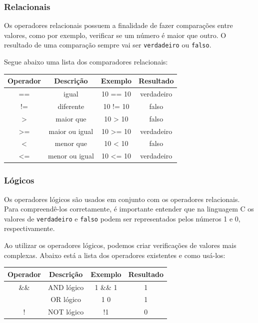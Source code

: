 \subsubsection{Relacionais}

Os operadores relacionais possuem a finalidade de fazer comparações entre 
valores, como por exemplo, verificar se um número é maior que outro. O 
resultado de uma comparação sempre vai ser \texttt{verdadeiro} ou 
\texttt{falso}.

Segue abaixo uma lista dos comparadores relacionais:

\begin{center}
    \begin{tabular}{|c|c|c|c|}
        \hline
        Operador & Descrição & Exemplo & Resultado \\
        \hline
        == & igual & 10 == 10 & verdadeiro \\
        \hline
        != & diferente & 10 != 10 & falso \\
        \hline
        \textgreater{} & maior que & 10 \textgreater{} 10 & falso \\
        \hline
        \textgreater{}= & maior ou igual & 10 \textgreater{}= 10 & verdadeiro \\
        \hline
        \textless{} & menor que & 10 \textless{} 10 & falso\\
        \hline
        \textless{}= & menor ou igual & 10 \textless{}= 10 & verdadeiro \\
        \hline
    \end{tabular}
\end{center}

\subsubsection{Lógicos}

Os operadores lógicos são usados em conjunto com os operadores relacionais. 
Para compreendê-los corretamente, é importante entender que na linguagem C 
os valores de \texttt{verdadeiro} e \texttt{falso} podem ser representados 
pelos números 1 e 0, respectivamente.

Ao utilizar os operadores lógicos, podemos criar verificações de valores 
mais complexas. Abaixo está a lista dos operadores existentes e como usá-los:

\begin{center}
    \begin{tabular}{|c|c|c|c|}
        \hline
        Operador & Descrição & Exemplo & Resultado \\
        \hline
        \&\& & AND lógico & 1 \&\& 1 & 1 \\
        \hline
        \textbar{}\textbar{} & OR lógico & 1 \textbar{}\textbar{} 0 & 1 \\
        \hline
        ! & NOT lógico & !1 & 0 \\
        \hline
    \end{tabular}
\end{center}

